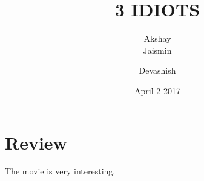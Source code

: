 \documentclass{article}
\title{3 IDIOTS}
\author{Akshay\\Jaismin}
\author{Devashish}
\date{April 2 2017}
\begin{document}
\maketitle
\section{Review}

The movie is very interesting.
\end{document}
